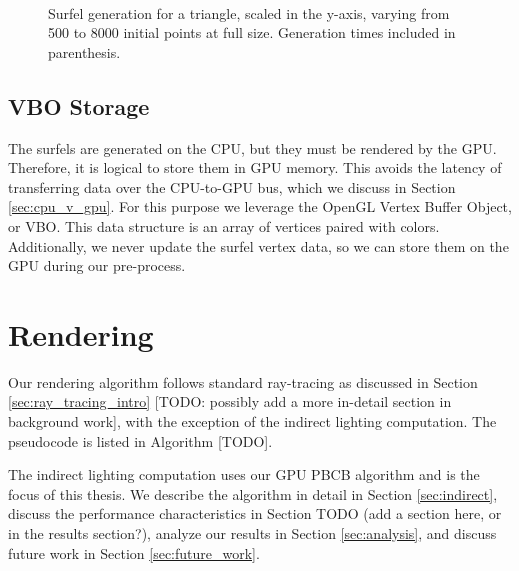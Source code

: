 \begin{figure}[h!]
   \\
   \captionfonts
   \caption[Triangle surfels at full size]{Surfel generation for a triangle, scaled in the y-axis, varying from 500 to 8000 initial points at full size. Generation times included in parenthesis.}
   \label{fig:triangle_surfels}
\end{figure}

\subsection{VBO Storage}
\label{sec:VBOStorage}

The surfels are generated on the CPU, but they must be rendered by the GPU. Therefore, it is logical to store them in GPU memory. This avoids the latency of transferring data over the CPU-to-GPU bus, which we discuss in Section \ref{sec:cpu_v_gpu}. For this purpose we leverage the OpenGL Vertex Buffer Object, or VBO. This data structure is an array of vertices paired with colors. Additionally, we never update the surfel vertex data, so we can store them on the GPU during our pre-process.

\section{Rendering}
\label{sec:rendering}
Our rendering algorithm follows standard ray-tracing as discussed in Section \ref{sec:ray_tracing_intro} [TODO: possibly add a more in-detail section in background work], with the exception of the indirect lighting computation. The pseudocode is listed in Algorithm [TODO].

The indirect lighting computation uses our GPU PBCB algorithm and is the focus of this thesis. We describe the algorithm in detail in Section \ref{sec:indirect}, discuss the performance characteristics in Section TODO (add a section here, or in the results section?), analyze our results in Section \ref{sec:analysis}, and discuss future work in Section \ref{sec:future_work}.

